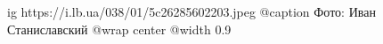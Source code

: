  
 
 
 
 

\ifcmt
  ig https://i.lb.ua/038/01/5c26285602203.jpeg
	@caption Фото: Иван Станиславский
  @wrap center
  @width 0.9
\fi
